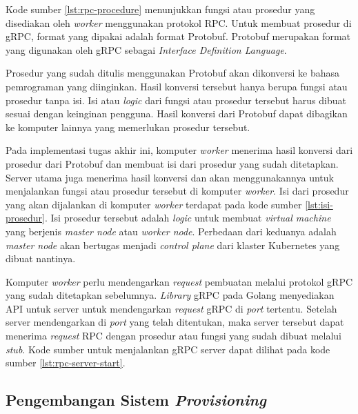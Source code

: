 Kode sumber \ref{lst:rpc-procedure} menunjukkan fungsi atau prosedur
yang disediakan oleh \emph{worker} menggunakan protokol RPC. Untuk membuat prosedur
di gRPC, format yang dipakai adalah format Protobuf. Protobuf merupakan format
yang digunakan oleh gRPC sebagai \emph{Interface Definition Language}.

Prosedur yang sudah ditulis menggunakan Protobuf akan dikonversi
ke bahasa pemrograman yang diinginkan. Hasil konversi tersebut hanya
berupa fungsi atau prosedur tanpa isi. Isi atau \emph{logic} dari fungsi atau prosedur
tersebut harus dibuat sesuai dengan keinginan pengguna. Hasil konversi dari Protobuf
dapat dibagikan ke komputer lainnya yang memerlukan prosedur tersebut. 

Pada implementasi tugas akhir ini, komputer \emph{worker} menerima
hasil konversi dari prosedur dari Protobuf dan membuat isi dari
prosedur yang sudah ditetapkan. Server utama juga menerima hasil konversi
dan akan menggunakannya untuk menjalankan fungsi atau prosedur tersebut di komputer
\emph{worker}. Isi dari prosedur yang akan dijalankan di komputer \emph{worker} terdapat
pada kode sumber \ref{lst:isi-prosedur}. Isi prosedur tersebut adalah \emph{logic}
untuk membuat \emph{virtual machine} yang berjenis \emph{master node} atau \emph{worker node}.
Perbedaan dari keduanya adalah \emph{master node} akan bertugas menjadi \emph{control plane}
dari klaster Kubernetes yang dibuat nantinya.

\clearpage



Komputer \emph{worker} perlu mendengarkan \emph{request} pembuatan melalui
protokol gRPC yang sudah ditetapkan sebelumnya. \emph{Library} gRPC pada Golang
menyediakan API untuk server untuk mendengarkan \emph{request} gRPC di \emph{port}
tertentu. Setelah server mendengarkan di \emph{port} yang telah ditentukan, maka
server tersebut dapat menerima \emph{request} RPC dengan prosedur atau fungsi
yang sudah dibuat melalui \emph{stub}. Kode sumber untuk menjalankan
gRPC server dapat dilihat pada kode sumber \ref{lst:rpc-server-start}.



\subsection{Pengembangan Sistem \emph{Provisioning}}
\label{sec:provisioning}

